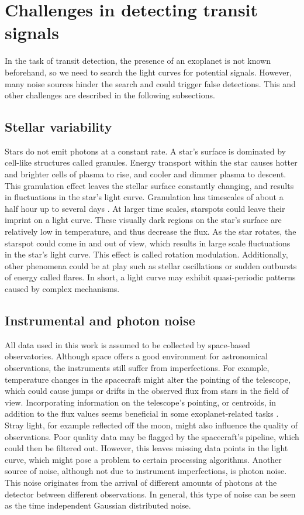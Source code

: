 
\section{Challenges in detecting transit signals}
\label{sec:challenges}

In the task of transit detection, the presence of an exoplanet is not known beforehand, 
so we need to search the light curves for potential signals. However, many noise sources hinder the search and could trigger false detections. This and other challenges are described in the following subsections.

\subsection{Stellar variability}
Stars do not emit photons at a constant rate. A star's surface is dominated by cell-like structures called granules. Energy transport within the star causes hotter and brighter cells of plasma to rise, and cooler and dimmer plasma to descent. This granulation effect leaves the stellar surface constantly changing, and results in fluctuations in the star’s light curve. Granulation has timescales of about a half hour up to several days \citep{kallinger2014connection}. At larger time scales, starspots could leave their imprint on a light curve. These visually dark regions on the star's surface are relatively low in temperature, and thus decrease the flux. As the star rotates, the starspot could come in and out of view, which results in large scale fluctuations in the star’s light curve. This effect is called rotation modulation. Additionally, other phenomena could be at play such as stellar oscillations or sudden outbursts of energy called flares. In short, a light curve may exhibit quasi-periodic patterns caused by complex mechanisms.

\subsection{Instrumental and photon noise}
All data used in this work is assumed to be collected by space-based observatories. Although space offers a good environment for astronomical observations, the instruments still suffer from imperfections. For example, temperature changes in the spacecraft might alter the pointing of the telescope, which could cause jumps or drifts in the observed flux from stars in the field of view. Incorporating information on the telescope’s pointing, or centroids, in addition to the flux values seems beneficial in some exoplanet-related tasks .  Stray light, for example reflected off the moon, might also influence the quality of observations. Poor quality data may be flagged by the spacecraft’s pipeline, which could then be filtered out. However, this leaves missing data points in the light curve, which might pose a problem to certain processing algorithms. 
Another source of noise, although not due to instrument imperfections, is photon noise. This noise originates from the arrival of different amounts of photons at the detector between different observations. In general, this type of noise can be seen as the time independent Gaussian distributed noise.

